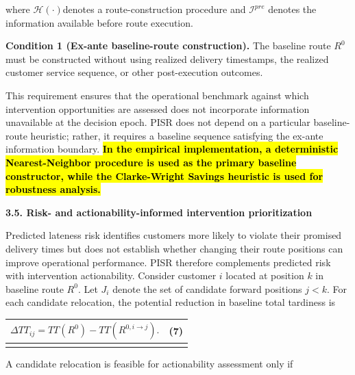 \documentclass[
]{article}
\newcounter{none} %
\begin{document}
where \(\mathcal{H}( \cdot )\)denotes a route-construction procedure and
\(\mathcal{I}^{pre}\) denotes the information available before route
execution.

\textbf{Condition 1 (Ex-ante baseline-route construction).} The baseline
route \(R^{0}\) must be constructed without using realized delivery
timestamps, the realized customer service sequence, or other
post-execution outcomes.

This requirement ensures that the operational benchmark against which
intervention opportunities are assessed does not incorporate information
unavailable at the decision epoch. PISR does not depend on a particular
baseline-route heuristic; rather, it requires a baseline sequence
satisfying the ex-ante information boundary. \textbf{\hl{In the
empirical implementation, a deterministic Nearest-Neighbor procedure is
used as the primary baseline constructor, while the Clarke-Wright
Savings heuristic is used for robustness analysis.}}

\textbf{3.5. Risk- and actionability-informed intervention
prioritization}

Predicted lateness risk identifies customers more likely to violate
their promised delivery times but does not establish whether changing
their route positions can improve operational performance. PISR
therefore complements predicted risk with intervention actionability.
Consider customer \(i\) located at position \(k\) in baseline route
\(R^{0}\). Let \(J_{i}\) denote the set of candidate forward positions
\(j < k\). For each candidate relocation, the potential reduction in
baseline total tardiness is

{\def\LTcaptype{none} %
\begin{longtable}[]{@{}
  >{\raggedright\arraybackslash}p{}
  >{\raggedright\arraybackslash}p{}@{}}
\toprule\noalign{}
\begin{minipage}[b]{\linewidth}\raggedright
\[\Delta TT_{ij} = TT\left( R^{0} \right) - TT\left( R^{0,i \rightarrow j} \right).\]
\end{minipage} & \begin{minipage}[b]{\linewidth}\raggedleft
(7)
\end{minipage} \\
\midrule\noalign{}
\endhead
\bottomrule\noalign{}
\endlastfoot
\end{longtable}
}

A candidate relocation is feasible for actionability assessment only if
\end{document}
